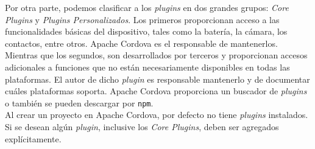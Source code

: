 Por otra parte, podemos clasificar a los \emph{plugins} en dos grandes grupos: \emph{Core Plugins} y \emph{Plugins Personalizados}. Los primeros proporcionan acceso a las funcionalidades básicas del dispositivo, tales como la batería, la cámara, los contactos, entre otros. Apache Cordova es el responsable de mantenerlos. Mientras que los segundos, son desarrollados por terceros y proporcionan accesos adicionales a funciones que no están necesariamente disponibles en todas las plataformas. El autor de dicho \emph{plugin} es responsable mantenerlo y de documentar cuáles plataformas soporta. Apache Cordova proporciona un buscador de \emph{plugins} o también se pueden descargar por \texttt{npm}.\\

Al crear un proyecto en Apache Cordova, por defecto no tiene \emph{plugins} instalados. Si se desean algún \emph{plugin}, inclusive los \emph{Core Plugins}, deben ser agregados explícitamente.